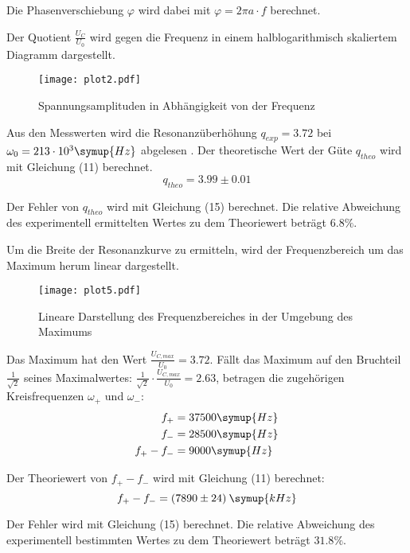 Die Phasenverschiebung $\varphi$ wird dabei mit $\varphi = 2 \pi a \cdot f$ berechnet.


Der Quotient $\frac{U_C}{U_0}$ wird gegen die Frequenz in einem halblogarithmisch skaliertem Diagramm
dargestellt.


\begin{figure}[H]
  \centering
  \texttt{[image: plot2.pdf]}
  \caption{Spannungsamplituden in Abhängigkeit von der Frequenz}
  \label{fig:plot2}
\end{figure}

Aus den Messwerten wird die Resonanzüberhöhung $q_{exp} = 3.72$ bei $\omega_0 = 213 \cdot 10^{3} \symup{Hz}$ abgelesen . Der theoretische Wert der
Güte $q_{theo}$ wird mit Gleichung (11) berechnet.
\begin{equation*}
  q_{theo} = 3.99 \pm 0.01
\end{equation*}

Der Fehler von $q_{theo}$ wird mit Gleichung (15) berechnet.
Die relative Abweichung des experimentell ermittelten Wertes zu dem Theoriewert beträgt $6.8\%$.

Um die Breite der Resonanzkurve zu ermitteln, wird der Frequenzbereich um das Maximum herum linear dargestellt.

\begin{figure}[H]
  \centering
  \texttt{[image: plot5.pdf]}
  \caption{Lineare Darstellung des Frequenzbereiches in der Umgebung des Maximums}
  \label{fig:plot5}
\end{figure}

Das Maximum hat den Wert $\frac{U_{C,max}}{U_0} = 3.72$. Fällt das Maximum auf den Bruchteil $\frac{1}{\sqrt{2}}$ seines Maximalwertes:
$\frac{1}{\sqrt{2}} \cdot \frac{U_{C,max}}{U_0} = 2.63$, betragen
die zugehörigen Kreisfrequenzen $\omega_+$ und $\omega_-$:
\begin{align*}
  f_+ &= 37500 \symup{Hz} \\
  f_- &= 28500 \symup{Hz} \\
  f_+ - f_- &= 9000 \symup{Hz}
\end{align*}

Der Theoriewert von $f_+ - f_-$ wird mit Gleichung (11) berechnet:
\begin{equation*}
  f_+ - f_- = (7890 \pm 24) \:\symup{kHz}
\end{equation*}

Der Fehler wird mit Gleichung (15) berechnet.
Die relative Abweichung des experimentell bestimmten Wertes zu dem Theoriewert beträgt $31.8 \%$.


